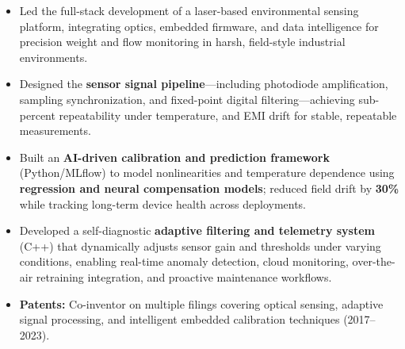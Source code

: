 \begin{itemize}[leftmargin=0.2in, topsep=1pt]
  \item Led the full-stack development of a laser-based environmental sensing platform, integrating optics, embedded firmware, and data intelligence for precision weight and flow monitoring in harsh, field-style industrial environments.  
  \item Designed the \textbf{sensor signal pipeline}—including photodiode amplification, sampling synchronization, and fixed-point digital filtering—achieving sub-percent repeatability under temperature, and EMI drift for stable, repeatable measurements.  
  \item Built an \textbf{AI-driven calibration and prediction framework} (Python/MLflow) to model nonlinearities and temperature dependence using \textbf{regression and neural compensation models}; reduced field drift by \textbf{30\%} while tracking long-term device health across deployments.  
  \item Developed a self-diagnostic \textbf{adaptive filtering and telemetry system} (C++) that dynamically adjusts sensor gain and thresholds under varying conditions, enabling real-time anomaly detection, cloud monitoring, over-the-air retraining integration, and proactive maintenance workflows.  
  \item \textbf{Patents:} Co-inventor on multiple filings covering optical sensing, adaptive signal processing, and intelligent embedded calibration techniques (2017–2023).  
\end{itemize}
  


\vspace*{-1pt}


